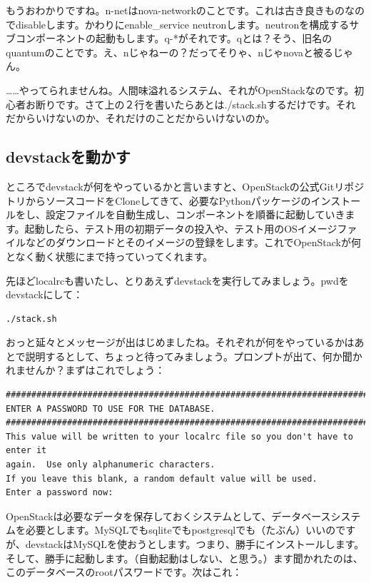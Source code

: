 \documentclass[9pt,b5paper,tombo,openany]{jsbook}
\begin{document}
もうおわかりですね。n-netはnova-networkのことです。これは古き良きものなのでdisableします。かわりにenable\_service neutronします。neutronを構成するサブコンポーネントの起動もします。q-*がそれです。qとは？そう、旧名のquantumのことです。え、nじゃねーの？だってそりゃ、nじゃnovaと被るじゃん。

……やってられませんね。人間味溢れるシステム、それがOpenStackなのです。初心者お断りです。さて上の２行を書いたらあとは./stack.shするだけです。それだからいけないのか、それだけのことだからいけないのか。

\subsection{devstackを動かす}

ところでdevstackが何をやっているかと言いますと、OpenStackの公式GitリポジトリからソースコードをCloneしてきて、必要なPythonパッケージのインストールをし、設定ファイルを自動生成し、コンポーネントを順番に起動していきます。起動したら、テスト用の初期データの投入や、テスト用のOSイメージファイルなどのダウンロードとそのイメージの登録をします。これでOpenStackが何となく動く状態にまで持っていってくれます。

先ほどlocalrcも書いたし、とりあえずdevstackを実行してみましょう。pwdをdevstackにして：

\begin{lstlisting}
./stack.sh
\end{lstlisting}

おっと延々とメッセージが出はじめましたね。それぞれが何をやっているかはあとで説明するとして、ちょっと待ってみましょう。プロンプトが出て、何か聞かれませんか？まずはこれでしょう：

\begin{lstlisting}
################################################################################
ENTER A PASSWORD TO USE FOR THE DATABASE.
################################################################################
This value will be written to your localrc file so you don't have to enter it
again.  Use only alphanumeric characters.
If you leave this blank, a random default value will be used.
Enter a password now:
\end{lstlisting}

OpenStackは必要なデータを保存しておくシステムとして、データベースシステムを必要とします。MySQLでもsqliteでもpostgresqlでも（たぶん）いいのですが、devstackはMySQLを使おうとします。つまり、勝手にインストールします。そして、勝手に起動します。（自動起動はしない、と思う。）ます聞かれたのは、このデータベースのrootパスワードです。次はこれ：
\end{document}
